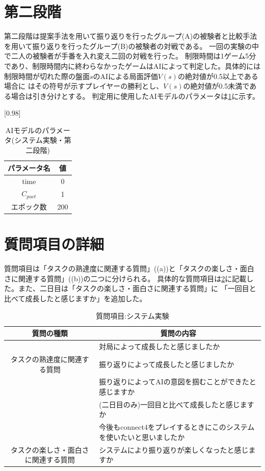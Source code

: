 \section{第二段階}
第二段階は提案手法を用いて振り返りを行ったグループ(A)の被験者と比較手法を用いて振り返りを行ったグループ(B)の被験者の対戦である。
一回の実験の中で二人の被験者が手番を入れ変え二回の対戦を行った。
制限時間は1ゲーム5分であり、制限時間内に終わらなかったゲームはAIによって判定した。具体的には制限時間が切れた際の盤面$s$のAIによる局面評価$V(s)$の絶対値が0.5以上である場合に
はその符号が示すプレイヤーの勝利とし、$V(s)$の絶対値が0.5未満である場合は引き分けとする。
判定用に使用したAIモデルのパラメータは\ref{table:param-judge}に示す。
\begin{table}[H]
	\caption{AIモデルのパラメータ(システム実験・第二段階)}
	\centering
	\scalebox{0.98}[0.98]{
		\begin{tabular}{c|c}
			パラメータ名 & 値 \\ \hline
			time    & 0\\ 
			$C_{puct}$    & 1 \\
            エポック数 & 200 \\
		\end{tabular}
	}
	\label{table:param-judge}
\end{table}


\section{質問項目の詳細}
質問項目は「タスクの熟達度に関連する質問」((a))と「タスクの楽しさ・面白さに関連する質問」((b))の二つに分けられる。
具体的な質問項目は\ref{table:query}に記載した。また、二日目は「タスクの楽しさ・面白さに関連する質問」に
「一回目と比べて成長したと感じますか」を追加した。
\begin{table}[H]
    \caption{質問項目:システム実験}
	\scriptsize
    \begin{tabular}{c||l}
        \multicolumn{1}{c|}{質問の種類} & \multicolumn{1}{c}{質問の内容} \\ \hline \hline
        \multicolumn{1}{c||}{}&対局によって成長したと感じましたか \\
        タスクの熟達度に関連する質問 & 振り返りによって成長したと感じましたか \\
		\multicolumn{1}{c||}{}&振り返りによってAIの意図を掴むことができたと感じますか \\
		\multicolumn{1}{c||}{} & (二日目のみ)一回目と比べて成長したと感じますか\\\hline
        \multicolumn{1}{c||}{} & 今後もconnect4をプレイするときにこのシステムを使いたいと思いましたか \\
        タスクの楽しさ・面白さに関連する質問 & システムにより振り返りが楽しくなったと感じますか\\
    \end{tabular}
    \label{table:query}
\end{table}

